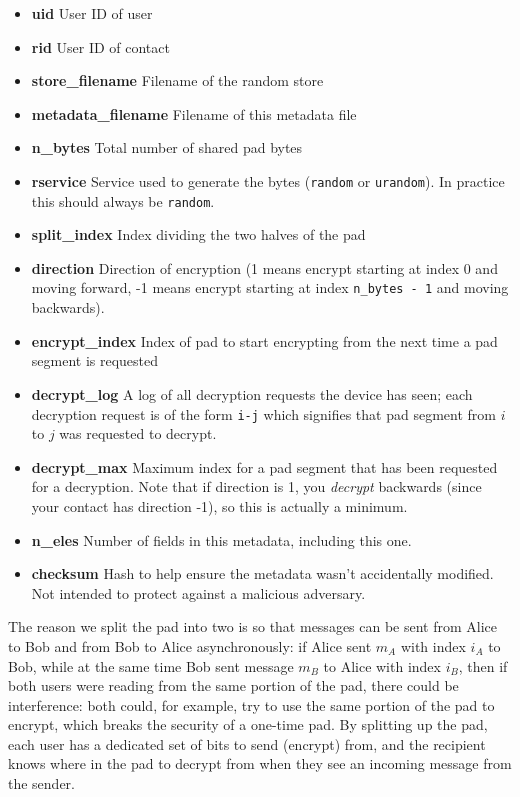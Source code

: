 \documentclass[twocolumn]{article}
\begin{document}
\begin{itemize} \itemsep0em 
  \item[] \textbf{uid} User ID of user
  \item[] \textbf{rid} User ID of contact
  \item[] \textbf{store\_filename} Filename of the random store
  \item[] \textbf{metadata\_filename} Filename of this metadata file
  \item[] \textbf{n\_bytes} Total number of shared pad bytes
  \item[] \textbf{rservice} Service used to generate the bytes (\texttt{random} or \texttt{urandom}). In practice this should always be \texttt{random}.
  \item[] \textbf{split\_index} Index dividing the two halves of the pad
  \item[] \textbf{direction} Direction of encryption (1 means encrypt starting at index 0 and moving forward, -1 means encrypt starting at index \texttt{n\_bytes - 1} and moving backwards).
  \item[] \textbf{encrypt\_index} Index of pad to start encrypting from the next time a pad segment is requested
  \item[] \textbf{decrypt\_log} A log of all decryption requests the device has seen; each decryption request is of the form \texttt{i-j} which signifies that pad segment from $i$ to $j$ was requested to decrypt.
  \item[] \textbf{decrypt\_max} Maximum index for a pad segment that has been requested for a decryption. Note that if direction is 1, you \emph{decrypt} backwards (since your contact has direction -1), so this is actually a minimum.
  \item[] \textbf{n\_eles} Number of fields in this metadata, including this one.
  \item[] \textbf{checksum} Hash to help ensure the metadata wasn't accidentally modified. Not intended to protect against a malicious adversary.
\end{itemize}

The reason we split the pad into two is so that messages can be sent from Alice to Bob and from Bob to Alice asynchronously: if Alice sent $m_A$ with index $i_A$ to Bob, while at the same time Bob sent message $m_B$ to Alice with index $i_B$, then if both users were reading from the same portion of the pad, there could be interference: both could, for example, try to use the same portion of the pad to encrypt, which breaks the security of a one-time pad. By splitting up the pad, each user has a dedicated set of bits to send (encrypt) from, and the recipient knows where in the pad to decrypt from when they see an incoming message from the sender.
\end{document}
